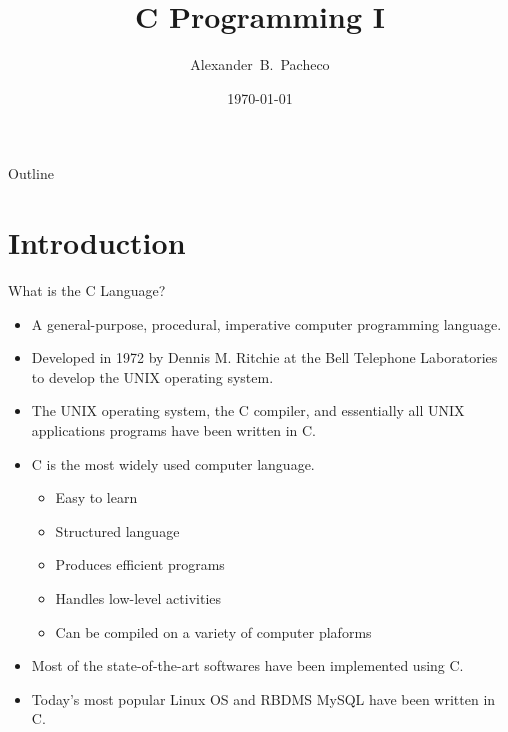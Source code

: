 \documentclass[10pt,t]{beamer}
\title{C Programming I}
\author[Alex Pacheco]{\large{Alexander~B.~Pacheco}}
\institute{\href{http://researchcomputing.lehigh.edu}{LTS Research Computing}}
\date{\today}
\begin{document}
\frame{\titlepage}

\begin{frame}{Outline}
  \tableofcontents
\end{frame}

\section{Introduction}
\begin{frame}{What is the C Language?}
  \begin{itemize}
    \item A general-purpose, procedural, imperative computer programming language.
    \item Developed in 1972 by Dennis M. Ritchie at the Bell Telephone Laboratories to develop the UNIX operating system.
    \item The UNIX operating system, the C compiler, and essentially all UNIX applications programs have been written in C.
    \item C is the most widely used computer language.
    \begin{itemize}
      \item Easy to learn
      \item Structured language
      \item Produces efficient programs
      \item Handles low-level activities
      \item Can be compiled on a variety of computer plaforms
    \end{itemize}
    \item Most of the state-of-the-art softwares have been implemented using C.
    \item Today's most popular Linux OS and RBDMS MySQL have been written in C.
  \end{itemize}
\end{frame}
\end{document}
